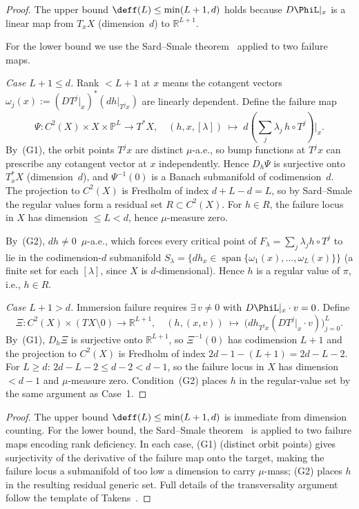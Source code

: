 \ifdraft
\begin{proof}
The upper bound $\deff(L) \leq \min(L+1,d)$ holds because $D\PhiL|_x$ is a
linear map from $T_x X$ (dimension~$d$) to $\mathbb{R}^{L+1}$.

For the lower bound we use the Sard--Smale theorem~\cite{Smale1965}
applied to two failure maps.

\emph{Case $L+1 \leq d$.}
Rank $< L+1$ at $x$ means the cotangent vectors
$\omega_j(x) := (DT^j|_x)^*(dh|_{T^j x})$ are linearly dependent.
Define the failure map
\[
  \Psi : C^2(X) \times X \times \mathbb{P}^L \to T^*X,
  \quad
  (h, x, [\lambda]) \;\mapsto\; d\!\left(\textstyle\sum_j \lambda_j\, h \circ T^j\right)\bigl|_x.
\]
By~(G1), the orbit points $T^j x$ are distinct $\mu$-a.e., so bump functions
at $T^j x$ can prescribe any cotangent vector at $x$ independently.
Hence $D_h\Psi$ is surjective onto $T^*_x X$ (dimension~$d$), and
$\Psi^{-1}(0)$ is a Banach submanifold of codimension~$d$.
The projection to $C^2(X)$ is Fredholm of index $d + L - d = L$, so by
Sard--Smale the regular values form a residual set $R \subset C^2(X)$.
For $h \in R$, the failure locus in $X$ has dimension $\leq L < d$, hence
$\mu$-measure zero.

By~(G2), $dh \neq 0$~$\mu$-a.e., which forces every critical point of
$F_\lambda = \sum_j \lambda_j h \circ T^j$ to lie in the codimension-$d$
submanifold $S_\lambda = \{dh_x \in \operatorname{span}\{\omega_1(x),\ldots,\omega_L(x)\}\}$
(a finite set for each $[\lambda]$, since $X$ is $d$-dimensional).
Hence $h$ is a regular value of $\pi$, i.e., $h \in R$.

\emph{Case $L+1 > d$.}
Immersion failure requires $\exists\, v \neq 0$ with $D\PhiL|_x \cdot v = 0$.
Define
\[
  \Xi : C^2(X) \times (TX \setminus 0) \to \mathbb{R}^{L+1},
  \quad
  (h,(x,v)) \;\mapsto\; \bigl(dh_{T^j x}(DT^j|_x \cdot v)\bigr)_{j=0}^L.
\]
By~(G1), $D_h\Xi$ is surjective onto $\mathbb{R}^{L+1}$, so $\Xi^{-1}(0)$
has codimension $L+1$ and the projection to $C^2(X)$ is Fredholm of index
$2d - 1 - (L+1) = 2d - L - 2$.
For $L \geq d$: $2d - L - 2 \leq d - 2 < d-1$, so the failure locus in $X$
has dimension $< d-1$ and $\mu$-measure zero.
Condition~(G2) places $h$ in the regular-value set by the same argument as
Case~1.
\end{proof}
\else
\begin{proof}
The upper bound $\deff(L) \leq \min(L+1,d)$ is immediate from dimension counting.
For the lower bound, the Sard--Smale theorem~\cite{Smale1965} is applied to two
failure maps encoding rank deficiency.
In each case, (G1) (distinct orbit points) gives surjectivity of the derivative
of the failure map onto the target, making the failure locus a submanifold of
too low a dimension to carry $\mu$-mass; (G2) places $h$ in the resulting
residual generic set.
Full details of the transversality argument follow the template of
Takens~\cite{Takens1981}.
\end{proof}
\fi

